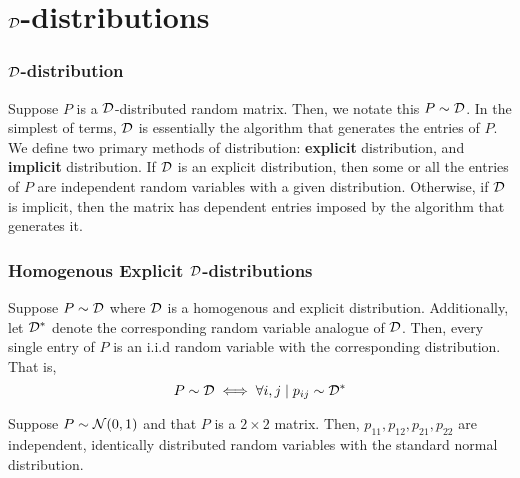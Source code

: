 

\section{$\mathcal{D}$-distributions}
\begin{frame}
\frametitle{$\mathcal{D}$-distribution}

  \begin{alertblock}{}
    Suppose $P$ is a $\mathcal{D}$-distributed random matrix. Then, we notate this $P \sim \mathcal{D}$. In the simplest of terms, $\mathcal{D}$ is essentially the algorithm that generates the entries of $P$.
    We define two primary methods of distribution: \textbf{explicit} distribution, and \textbf{implicit} distribution.
    If $\mathcal{D}$ is an explicit distribution, then some or all the entries of $P$ are independent random variables with a given distribution.
    Otherwise, if $\mathcal{D}$ is implicit, then the matrix has dependent entries imposed by the algorithm that generates it.
  \end{alertblock}

\end{frame}
\begin{frame} \frametitle{Homogenous Explicit $\mathcal{D}$-distributions}

  \begin{alertblock}{}
    Suppose $P \sim \mathcal{D}$ where $\mathcal{D}$ is a homogenous and explicit distribution. Additionally, let $\mathcal{D}^*$ denote the corresponding random variable analogue of $\mathcal{D}$.
    Then, every single entry of $P$ is an i.i.d random variable with the corresponding distribution. That is,
    $$ P \sim \mathcal{D} \iff \forall i,j \mid p_{ij} \sim \mathcal{D}^* $$
  \end{alertblock}

  \begin{examples}
  Suppose $P \sim \mathcal{N}(0,1)$ and that $P$ is a $2 \times 2$ matrix.
  Then, $p_{11}, p_{12}, p_{21}, p_{22}$ are independent, identically distributed random variables with the standard normal distribution.
  \end{examples}

\end{frame}
